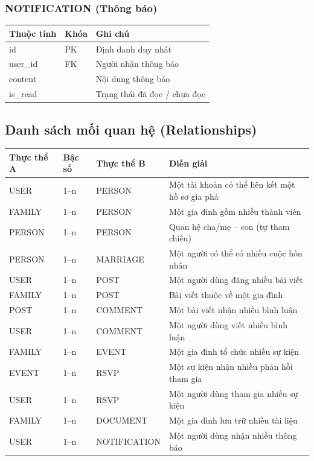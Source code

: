 \subsubsection{NOTIFICATION (Thông báo)}
\begin{longtable}{@{}p{3cm}p{2cm}p{9.5cm}@{}}
\toprule
\textbf{Thuộc tính} & \textbf{Khóa} & \textbf{Ghi chú} \\
\midrule
id & PK & Định danh duy nhất \\
user\_id & FK & Người nhận thông báo \\
content & & Nội dung thông báo \\
is\_read & & Trạng thái đã đọc / chưa đọc \\
\bottomrule
\end{longtable}

\subsection{Danh sách mối quan hệ (Relationships)}
\begin{longtable}{@{}p{3.2cm}p{1.2cm}p{3.2cm}p{6.5cm}@{}}
\toprule
\textbf{Thực thể A} & \textbf{Bậc số} & \textbf{Thực thể B} & \textbf{Diễn giải} \\
\midrule
USER & 1--n & PERSON & Một tài khoản có thể liên kết một hồ sơ gia phả \\
FAMILY & 1--n & PERSON & Một gia đình gồm nhiều thành viên \\
PERSON & 1--n & PERSON & Quan hệ cha/mẹ -- con (tự tham chiếu) \\
PERSON & 1--n & MARRIAGE & Một người có thể có nhiều cuộc hôn nhân \\
USER & 1--n & POST & Một người dùng đăng nhiều bài viết \\
FAMILY & 1--n & POST & Bài viết thuộc về một gia đình \\
POST & 1--n & COMMENT & Một bài viết nhận nhiều bình luận \\
USER & 1--n & COMMENT & Một người dùng viết nhiều bình luận \\
FAMILY & 1--n & EVENT & Một gia đình tổ chức nhiều sự kiện \\
EVENT & 1--n & RSVP & Một sự kiện nhận nhiều phản hồi tham gia \\
USER & 1--n & RSVP & Một người dùng tham gia nhiều sự kiện \\
FAMILY & 1--n & DOCUMENT & Một gia đình lưu trữ nhiều tài liệu \\
USER & 1--n & NOTIFICATION & Một người dùng nhận nhiều thông báo \\
\bottomrule
\end{longtable}
